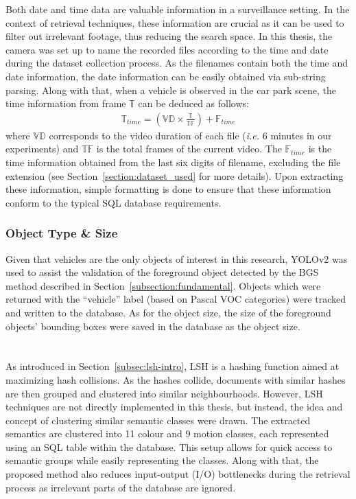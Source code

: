 Both date and time data are valuable information in a surveillance setting. In the context of retrieval techniques, these information are crucial as it can be used to filter out irrelevant footage, thus reducing the search space. In this thesis, the camera was set up to name the recorded files according to the time and date during the dataset collection process. As the filenames contain both the time and date information, the date information can be easily obtained via sub-string parsing. Along with that, when a vehicle is observed in the car park scene, the time information from frame $\mathbb{T}$ can be deduced as follows:
\begin{align}
\label{eq:timecount}
    \mathbb{T}_{time}  = (\mathbb{VD} \times \frac{\mathbb{T}}{\mathbb{TF}}) + \mathbb{F}_{time}
\end{align}
where $\mathbb{VD}$ corresponds to the video duration of each file (\emph{i.e.} 6 minutes in our experiments) and $\mathbb{TF}$ is the total frames of the current video. The $\mathbb{F}_{time}$ is the time information obtained from the last six digits of filename, excluding the file extension (see Section~\ref{section:dataset_used} for more details). Upon extracting these information, simple formatting is done to ensure that these information conform to the typical SQL database requirements.


\subsubsection{Object Type \& Size}
\label{objecttype}
Given that vehicles are the only objects of interest in this research, YOLOv2 was used to assist the validation of the foreground object detected by the BGS method described in Section~\ref{subsection:fundamental}. Objects which were returned with the ``vehicle'' label (based on Pascal VOC categories) were tracked and written to the database. As for the object size, the size of the foreground objects' bounding boxes were saved in the database as the object size.


\section{\versionOneExt}
\label{section:semantic_lsh}

As introduced in Section~\ref{subsec:lsh-intro}, LSH is a hashing function aimed at maximizing hash collisions.
As the hashes collide, documents with similar hashes are then grouped and clustered into similar neighbourhoods.
However, LSH techniques are not directly implemented in this thesis, but instead, the idea and concept of clustering similar semantic classes were drawn.
The extracted semantics are clustered into 11 colour and 9 motion classes, each represented using an SQL table within the database.
This setup allows for quick access to semantic groups while easily representing the classes. Along with that, the proposed method also reduces input-output (I/O) bottlenecks during the retrieval process as irrelevant parts of the database are ignored.


